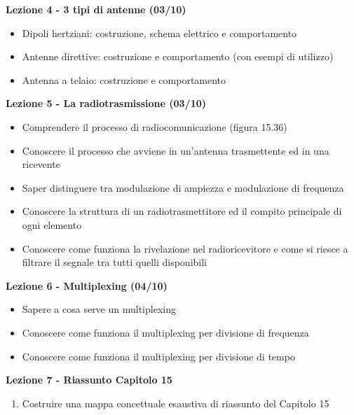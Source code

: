 \documentclass{article}
\begin{document}
	\begin{center}
		\textbf{Lezione 4 - 3 tipi di antenne (03/10)}
		\begin{itemize}
			\item Dipoli hertziani: costruzione, schema elettrico e comportamento
			\item Antenne direttive: costruzione e comportamento (con esempi di utilizzo)
			\item Antenna a telaio: costruzione e comportamento
		\end{itemize}
	\end{center}

	\begin{center}
		\textbf{Lezione 5 - La radiotrasmissione (03/10)}
		\begin{itemize}
			\item Comprendere il processo di radiocomunicazione (figura 15.36)
			\item Conoscere il processo che avviene in un'antenna trasmettente ed in una ricevente
			\item Saper distinguere tra modulazione di ampiezza e modulazione di frequenza
			\item Conoscere la struttura di un radiotrasmettitore ed il compito principale di ogni elemento
			\item Conoscere come funziona la rivelazione nel radioricevitore e come si riesce a filtrare il segnale tra tutti quelli disponibili
		\end{itemize}
	\end{center}

	\begin{center}
		\textbf{Lezione 6 - Multiplexing (04/10)}
		\begin{itemize}
			\item Sapere a cosa serve un multiplexing
			\item Conoscere come funziona il multiplexing per divisione di frequenza
			\item Conoscere come funziona il multiplexing per divisione di tempo
		\end{itemize}
	\end{center}
	
	\begin{center}
	\textbf{Lezione 7 - Riassunto Capitolo 15}
	\begin{enumerate}
	\item Costruire una mappa concettuale esaustiva di riassunto del Capitolo 15
	\end{enumerate}
	\end{center}
	
\end{document}
